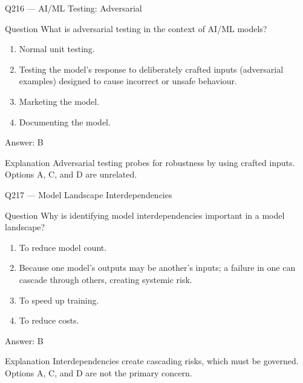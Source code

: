 \documentclass[aspectratio=169,8pt]{beamer}
\begin{document}
																							\begin{frame}{Q216 --- AI/ML Testing: Adversarial}
																								\begin{block}{Question}
																									What is adversarial testing in the context of AI/ML models?
																									\begin{enumerate}
																										\item Normal unit testing.
																										\item Testing the model's response to deliberately crafted inputs (adversarial examples) designed to cause incorrect or unsafe behaviour.
																										\item Marketing the model.
																										\item Documenting the model.
																									\end{enumerate}  \end{block}
																									\begin{exampleblock}{Answer: B}\end{exampleblock}
																									\begin{block}{Explanation}
																										Adversarial testing probes for robustness by using crafted inputs. Options A, C, and D are unrelated.
																									\end{block}
																								\end{frame}
																								
																								\begin{frame}{Q217 --- Model Landscape Interdependencies}
																									\begin{block}{Question}
																										Why is identifying model interdependencies important in a model landscape?
																										\begin{enumerate}
																											\item To reduce model count.
																											\item Because one model's outputs may be another's inputs; a failure in one can cascade through others, creating systemic risk.
																											\item To speed up training.
																											\item To reduce costs.
																										\end{enumerate}  \end{block}
																										\begin{exampleblock}{Answer: B}\end{exampleblock}
																										\begin{block}{Explanation}
																											Interdependencies create cascading risks, which must be governed. Options A, C, and D are not the primary concern.
																										\end{block}
																									\end{frame}
																									
\end{document}
